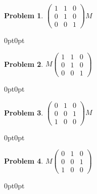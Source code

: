 \documentclass[12pt]{article}
\newenvironment{answer}
    {\begin{adjustwidth}{0pt}{0pt}}
    {\end{adjustwidth}}
\newtheorem{problem}{Problem}
\theoremstyle{remark}  %
\begin{document}
\begin{problem} $
    \begin{pmatrix}
        1 & 1 & 0 \\
        0 & 1 & 0 \\
        0 & 0 & 1
    \end{pmatrix} M
    $
\end{problem}
\begin{answer}
    
\end{answer}
\begin{problem} $ M
    \begin{pmatrix}
        1 & 1 & 0 \\
        0 & 1 & 0 \\
        0 & 0 & 1
    \end{pmatrix}
    $
\end{problem}
\begin{answer}
    
\end{answer}
\begin{problem} $
    \begin{pmatrix}
        0 & 1 & 0 \\
        0 & 0 & 1 \\
        1 & 0 & 0
    \end{pmatrix} M
    $
\end{problem}
\begin{answer}
    
\end{answer}
\begin{problem} $ M
    \begin{pmatrix}
        0 & 1 & 0 \\
        0 & 0 & 1 \\
        1 & 0 & 0
    \end{pmatrix}
    $
\end{problem}
\begin{answer}
    
\end{answer}
\end{document}
